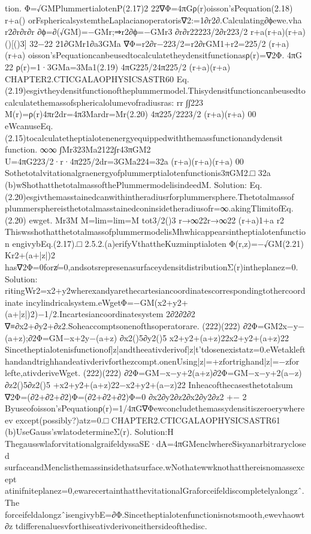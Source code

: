 tion.
Φ=√GMPlummertialotenP(2.17)2
22∇Φ=4πGρ(r)oisson’sPequation(2.18)
r+a()
orFsphericalsystemtheLaplacianoperatoris∇2:=1∂r2∂.Calculating∂ϕewe.vha
r2∂r∂r∂r
∂ϕ=∂(√GM)=−GMr;⇒r2∂ϕ=−GMr3
∂r∂r22223/2∂r223/2
r+a(r+a)(r+a)
()[()3]
32−22
21∂GMr1∂a3GMa
∇Φ=r2∂r−223/2=r2∂rGM1+r2=225/2
(r+a)(r+a)
oisson’sPequationcanbeusedtocalculatetheydensitfunctionasρ(r)=∇2Φ.
4πG
22
ρ(r)=1·3GMa=3Ma1(2.19)
4πG225/24π225/2
(r+a)(r+a)
CHAPTER2.CTICGALAOPHYSICSASTR60
Eq.(2.19)esgivtheydensitfunctionoftheplummermodel.Thisydensitfunctioncanbeusedto
calculatethemassofsphericalolumevofradiusras:
rr
∫∫223
M(r)=ρ(r)4πr2dr=4π3Mardr=Mr(2.20)
4π225/2223/2
(r+a)(r+a)
00
eWcanuseEq.(2.15)tocalculatetheptialotenenergyequippedwiththemassfunctionandydensit
function.
∞∞
∫Mr323Ma2122∫r43πGM2
U=4πG223/2·r·4π225/2dr=3GMa224=32a
(r+a)(r+a)(r+a)
00
Sothetotalvitationalgraenergyofplummerptialotenfunctionis3πGM2.□
32a
(b)wShothatthetotalmassofthePlummermodelisindeedM.
Solution:
Eq.(2.20)esgivthemasstainedcanwithintheradiusrforplummersphere.Thetotalmassof
plummersphereisthetotalmasstainedconinsidetheradiusofr=∞.akingTlimitofEq.(2.20)
ewget.
Mr3M
M=lim=lim=M
tot3/2()3
r→∞22r→∞22
(r+a)1+a
r2
ThiswsshothatthetotalmassofplummermodelisMhwhicappearsintheptialotenfunction
engivybEq.(2.17).□
2.5.2.(a)erifyVthattheKuzminptialoten
Φ(r,z)=−√GM(2.21)
Kr2+(a+|z|)2
has∇2Φ=0forz̸=0,andsotsrepresenasurfaceydensitdistributionΣ(r)intheplanez=0.
Solution:
ritingWr2=x2+y2wherexandyarethecartesiancoordinatescorrespondingtothercoordinate
incylindricalsystem.eWgetΦ=−GM(x2+y2+(a+|z|)2)−1/2.Incartesiancoordinatesystem
2∂2∂2∂2
∇≡∂x2+∂y2+∂z2.Soheaccomptsonenofthsoperatorare.
(222)(222)
∂2Φ=GM2x−y−(a+z);∂2Φ=GM−x+2y−(a+z)
∂x2()5∂y2()5
x2+y2+(a+z)22x2+y2+(a+z)22
Sincetheptialotenisfunctionof|z|andtheeativderivof|z|t’tdosenexistatz=0.eWetakleft
handandtrighhandeativderivforthezcompt.onenUsing|z|=+zfortrighand|z|=−zfor
lefte,ativderiveWget.
(222)(222)
∂2Φ=GM−x−y+2(a+z)∂2Φ=GM−x−y+2(a−z)
∂z2()5∂z2()5
+x2+y2+(a+z)22−x2+y2+(a−z)22
Inheacofthecasesthetotalsum
∇2Φ=(∂2+∂2+∂2)Φ=(∂2+∂2+∂2)Φ=0
∂x2∂y2∂z2∂x2∂y2∂z2
+−
2
Byuseofoisson’sPequationρ(r)=1/4πG∇Φewconcludethemassydensitiszeroerywhereev
except(possibly?)atz=0.□
CHAPTER2.CTICGALAOPHYSICSASTR61
(b)UseGauss’swlatodetermineΣ(r).
Solution:H
ThegausswlaforvitationalgraifeldyssaSE·dA=4πGMenclwhereSisyanarbitraryclosed
surfaceandMenclisthemassinsidethatsurface.wNothatewwknothatthereisnomassexcept
atinifniteplanez=0,ewarecertainthatthevitationalGraforceifeldiscompletelyalongzˆ.The
forceifeldalongzˆisengivybE=∂Φ.Sincetheptialotenfunctionisnotsmooth,ewevhaowt
∂z
tdifferenaluesvforthiseativderivoneithersideofthedisc.
